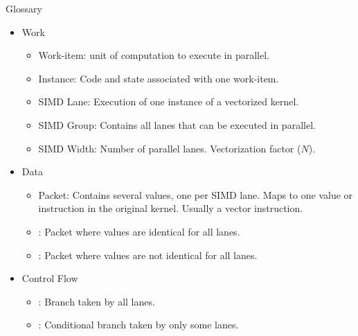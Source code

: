 \begin{frame}{Glossary}

\begin{itemize}
    \item Work
    \begin{itemize}
        \item Work-item: unit of computation to execute in parallel.
        \item Instance: Code and state associated with one work-item.
        \item SIMD Lane: Execution of one instance of a vectorized kernel.
        \item SIMD Group: Contains all lanes that can be executed in parallel.
        \item SIMD Width: Number of parallel lanes. Vectorization factor ($N$).
    \end{itemize}
        
    \item Data
    \begin{itemize}
        \item Packet: Contains several values, one per SIMD lane. Maps to one value or instruction in the original kernel. Usually a vector instruction.
        \item {}: Packet where values are identical for all lanes.
        \item {}: Packet where values are not identical for all lanes.
    \end{itemize}

    \item Control Flow
    \begin{itemize}
        \item {}: Branch taken by all lanes.
        \item {}: Conditional branch taken by only some lanes.
    \end{itemize}
\end{itemize}

\end{frame}
